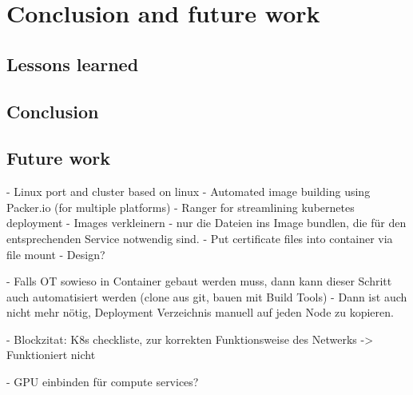 \chapter{Conclusion and future work} %

\label{chap:conclusion} %



\section{Lessons learned}

\section{Conclusion}



\section{Future work}
- Linux  port and cluster based on linux
- Automated image building using Packer.io (for multiple platforms)
- Ranger for streamlining kubernetes deployment
- Images verkleinern - nur die Dateien ins Image bundlen, die für den entsprechenden Service notwendig sind.
- Put certificate files into container via file mount - Design?

- Falls OT sowieso in Container gebaut werden muss, dann kann dieser Schritt auch automatisiert werden (clone aus git, bauen mit Build Tools)
- Dann ist auch nicht mehr nötig, Deployment Verzeichnis manuell auf jeden Node zu kopieren.


- Blockzitat: K8s checkliste, zur korrekten Funktionsweise des Netwerks -> Funktioniert nicht

- GPU einbinden für compute services?

